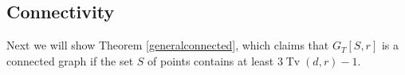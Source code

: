 \documentclass[11pt,a4paper]{article}
\theoremstyle{plain}
\newtheorem{proposition}{Proposition}
\theoremstyle{definition}
\newcommand{\rr}{\mathds{R}}
\newcommand{\conv}{\operatorname{conv}}
\newcommand{\tv}{\operatorname{Tv}}
\begin{document}



\subsection{Connectivity}


 Next we will show Theorem \ref{generalconnected}, which claims that $G_T[S,r]$ is a connected graph if the set $S$ of points contains at least $3\tv(d,r)-1$.
\end{document}
